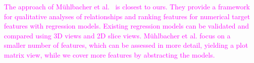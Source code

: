 \documentclass[journal]{style/vgtc} 			          %
\newcommand{\magenta}[1]{\textcolor{magenta}{#1}}
\begin{document}
\magenta{
The approach of M\"{u}hlbacher et al.~\cite{Muehlbacher} is closest to ours.
They provide a framework for qualitative analyses of relationships and ranking features for numerical target features with regression models.
Existing regression models can be validated and compared using 3D views and 2D slice views.
M\"{u}hlbacher et al. focus on a smaller number of features, which can be assessed in more detail, yielding a plot matrix view, while we cover more features by abstracting the models.
}
\end{document}
